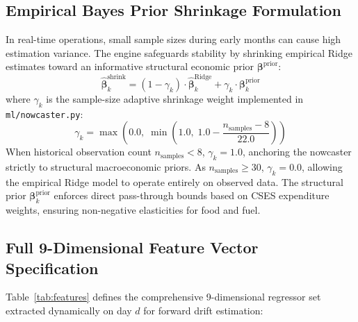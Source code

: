 \documentclass[a4paper, 11pt]{article}
\begin{document}
\subsection{Empirical Bayes Prior Shrinkage Formulation}
In real-time operations, small sample sizes during early months can cause high estimation variance. The engine safeguards stability by shrinking empirical Ridge estimates toward an informative structural economic prior $\boldsymbol{\beta}^{\text{prior}}$:
\begin{equation}
    \boxed{\hat{\boldsymbol{\beta}}_k^{\text{shrink}} = (1 - \gamma_k) \cdot \hat{\boldsymbol{\beta}}_k^{\text{Ridge}} + \gamma_k \cdot \boldsymbol{\beta}_k^{\text{prior}}}
\end{equation}
where $\gamma_k$ is the sample-size adaptive shrinkage weight implemented in \texttt{ml/nowcaster.py}:
\begin{equation}
    \gamma_k = \max\left( 0.0, \; \min\left( 1.0, \; 1.0 - \frac{n_{\text{samples}} - 8}{22.0} \right) \right)
\end{equation}
When historical observation count $n_{\text{samples}} < 8$, $\gamma_k = 1.0$, anchoring the nowcaster strictly to structural macroeconomic priors. As $n_{\text{samples}} \ge 30$, $\gamma_k = 0.0$, allowing the empirical Ridge model to operate entirely on observed data. The structural prior $\boldsymbol{\beta}_k^{\text{prior}}$ enforces direct pass-through bounds based on CSES expenditure weights, ensuring non-negative elasticities for food and fuel.

\subsection{Full 9-Dimensional Feature Vector Specification}
Table~\ref{tab:features} defines the comprehensive 9-dimensional regressor set extracted dynamically on day $d$ for forward drift estimation:
\end{document}
